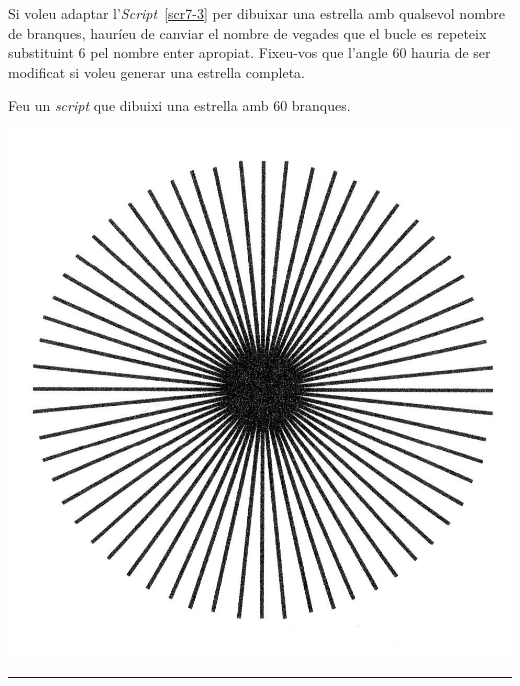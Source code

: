 Si voleu adaptar l'\emph{Script}~\ref{scr7-3} per dibuixar una estrella amb qualsevol nombre de branques, hauríeu de canviar el nombre de vegades que el bucle es repeteix substituint \textsf{6} pel nombre enter apropiat. Fixeu-vos que l'angle \textsf{60} hauria de ser modificat si voleu generar una estrella completa.

\begin{center}
\colorbox{black}{}
\end{center}
{\small
\noindent
Feu un \emph{script} que dibuixi una estrella amb 60 branques.}
\begin{center}
\includegraphics[scale=0.12]{Imatges/figuraE7-1.jpg} 
\end{center}
\noindent
\rule{\textwidth}{3pt}

\vspace*{5mm}

